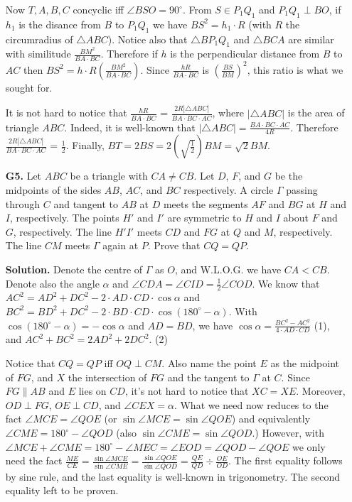 \documentclass[11pt,a4paper]{article}
\begin{document}
\begin{enumerate}
Now $T, A, B, C$ concyclic iff $\angle BSO=90^{\circ}$. From $S\in P_1Q_1$ and $P_1Q_1\perp BO$, if $h_1$ is the disance from $B$ to $P_1Q_1$ we have $BS^2=h_1\cdot R$ (with $R$ the circumradius of $\triangle ABC$). Notice also that $\triangle BP_1Q_1$ and $\triangle BCA$ are similar with similitude $\frac{BM^2}{BA\cdot BC}$. Therefore if $h$ is the perpendicular distance from $B$ to $AC$ then $BS^2=h\cdot R(\frac{BM^2}{BA\cdot BC})$. Since $\frac{hR}{BA\cdot BC}$ is $\left (\frac{BS}{BM}\right )^2$, this ratio is what we sought for.

It is not hard to notice that $\frac{hR}{BA\cdot BC}$ = $\frac{2R|\triangle ABC|}{BA\cdot BC\cdot AC}$, where $|\triangle ABC|$ is the area of triangle $ABC$. Indeed, it is well-known that $|\triangle ABC|=\frac{BA\cdot BC\cdot AC}{4R}.$ Therefore $\frac{2R|\triangle ABC|}{BA\cdot BC\cdot AC}$ =  $\frac12$. Finally, $BT=2BS=2\left(\sqrt{\frac12}\right)BM=\sqrt2 BM.$

\item[\textbf{G5.}] Let $ABC$ be a triangle with $CA \neq CB$. Let $D$, $F$, and $G$ be the midpoints of the sides $AB$, $AC$, and $BC$ respectively. A circle $\Gamma$ passing through $C$ and tangent to $AB$ at $D$ meets the segments $AF$ and $BG$ at $H$ and $I$, respectively. The points $H'$ and $I'$ are symmetric to $H$ and $I$ about $F$ and $G$, respectively. The line $H'I'$ meets $CD$ and $FG$ at $Q$ and $M$, respectively. The line $CM$ meets $\Gamma$ again at $P$. Prove that $CQ = QP$.

\textbf{Solution.} Denote the centre of $\Gamma$ as $O$, and W.L.O.G. we have $CA<CB$. Denote also the angle $\alpha$ and $\angle CDA=\angle CID=\frac{1}{2}\angle COD$. We know that $AC^2= AD^2+DC^2-2\cdot AD\cdot CD\cdot\cos\alpha$ and $BC^2= BD^2+DC^2-2\cdot BD\cdot CD\cdot\cos(180^{\circ}-\alpha)$. With $\cos(180^{\circ}-\alpha)=-\cos\alpha$ and $AD=BD$, we have $\cos\alpha=\frac{BC^2-AC^2}{4\cdot AD\cdot CD}$ (1), and $AC^2+BC^2=2AD^2+2DC^2$. (2)

Notice that $CQ=QP$ iff $OQ\perp CM$. Also name the point $E$ as the midpoint of $FG$, and $X$ the intersection of $FG$ and the tangent to $\Gamma$ at $C$. Since $FG\parallel AB$ and $E$ lies on $CD$, it's not hard to notice that $XC=XE$. Moreover, $OD\perp FG$, $OE\perp CD$, and $\angle CEX=\alpha$. What we need now reduces to the fact $\angle MCE=\angle QOE$ (or $\sin\angle MCE=\sin\angle QOE$) and equivalently $\angle CME=180^{\circ}-\angle QOD$ (also $\sin\angle CME=\sin\angle QOD$.) However, with $\angle MCE+\angle CME=180^{\circ}-\angle MEC=\angle EOD=\angle QOD-\angle QOE$ we only need the fact $\frac{ME}{CE}=\frac {\sin\angle MCE}{\sin\angle CME}=\frac {\sin\angle QOE}{\sin\angle QOD}=\frac {QE}{QD}\div \frac{OE}{OD}.$ The first equality follows by sine rule, and the last equality is well-known in trigonometry. The second equality left to be proven.


\end{enumerate}
\end{document}
